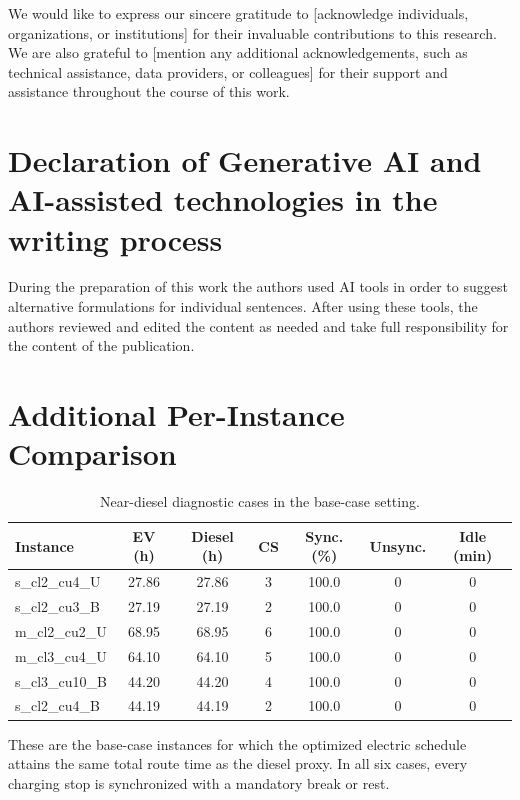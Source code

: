 \documentclass[3p,11pt,authoryear]{elsarticle}  %
\begin{document}
We would like to express our sincere gratitude to [acknowledge individuals, organizations, or institutions] for their invaluable contributions to this research. We are also grateful to [mention any additional acknowledgements, such as technical assistance, data providers, or colleagues] for their support and assistance throughout the course of this work.

\section*{Declaration of Generative AI and AI-assisted technologies in the writing process}

During the preparation of this work the authors used AI tools in order to suggest alternative formulations for individual sentences. After using these tools, the authors reviewed and edited the content as needed and take full responsibility for the content of the publication.





\appendix
\newpage

\section{Additional Per-Instance Comparison}
\label{appendix:diagnostics}

\begin{table}[!htbp]
\centering
\caption{Near-diesel diagnostic cases in the base-case setting.}
\label{tab:near_diesel_cases}
\begin{threeparttable}
\small
\setlength{\tabcolsep}{3.5pt}
\renewcommand{\arraystretch}{1.1}
\begin{tabular}{
p{4.0cm}
S[table-format=2.2]
S[table-format=2.2]
S[table-format=1.0]
S[table-format=3.1]
S[table-format=1.0]
S[table-format=3.0]
}
\toprule
Instance & {EV (h)} & {Diesel (h)} & {CS} & {Sync. (\%)} & {Unsync.} & {Idle (min)} \\
\midrule
s\_cl2\_cu4\_U & 27.86 & 27.86 & 3 & 100.0 & 0 & 0 \\
s\_cl2\_cu3\_B   & 27.19 & 27.19 & 2 & 100.0 & 0 & 0 \\
m\_cl2\_cu2\_U   & 68.95 & 68.95 & 6 & 100.0 & 0 & 0 \\
m\_cl3\_cu4\_U   & 64.10 & 64.10 & 5 & 100.0 & 0 & 0 \\
s\_cl3\_cu10\_B  & 44.20 & 44.20 & 4 & 100.0 & 0 & 0 \\
s\_cl2\_cu4\_B   & 44.19 & 44.19 & 2 & 100.0 & 0 & 0 \\
\bottomrule
\end{tabular}
\begin{tablenotes}[flushleft]
\footnotesize
\item These are the base-case instances for which the optimized electric schedule attains the same total route time as the diesel proxy. In all six cases, every charging stop is synchronized with a mandatory break or rest.
\end{tablenotes}
\end{threeparttable}
\end{table}
\end{document}

